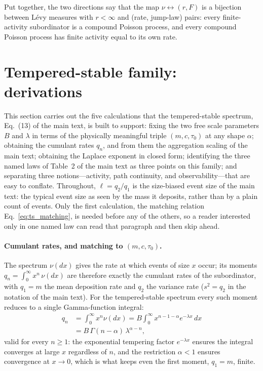 \documentclass[preprint,12pt]{elsarticle}
\begin{document}
Put together, the two directions say that the map
$\nu\leftrightarrow(r,F)$ is a bijection between L\'evy measures with
$r<\infty$ and (rate, jump-law) pairs: every finite-activity subordinator
is a compound Poisson process, and every compound Poisson process has
finite activity equal to its own rate. 

\section{Tempered-stable family: derivations}
\label{app:tempered}

This section carries out the five calculations that the tempered-stable
spectrum, Eq.~(13) of the main text, is built to support: fixing the two free scale parameters $B$ and $\lambda$ in terms of the physically meaningful triple $(m,c,\tau_0)$ at any shape $\alpha$; obtaining the
cumulant rates $q_n$, and from them the aggregation scaling of the main text; obtaining the Laplace exponent in
closed form; identifying the three named laws of Table~2 of the main text as three points on this family; and separating three notions---activity, path continuity, and observability---that are easy to conflate. Throughout, $\ell=q_2/q_1$ is the size-biased
event size of the main text: the typical event size as seen by the mass it deposits, rather than by a plain count of events. Only the first calculation, the matching relation Eq.~\eqref{eq:ts_matching}, is needed before any of the others, so a reader interested only in one named law can read that paragraph and then skip ahead.

\paragraph*{Cumulant rates, and matching to $(m,c,\tau_0)$.}
The spectrum $\nu(dx)$ gives the rate at which events of size $x$ occur; its moments $q_n=\int_0^\infty x^n\,\nu(dx)$ are therefore exactly the cumulant rates of the subordinator, with $q_1=m$ the mean deposition rate and $q_2$ the variance rate ($s^2=q_2$ in the notation of the main text). For the tempered-stable spectrum every such moment reduces to a single Gamma-function integral:
\begin{equation}
\begin{aligned}
  q_n&=\int_0^\infty x^n\nu(dx)
      =B\int_0^\infty x^{n-1-\alpha}e^{-\lambda x}\,dx\\[2pt]
     &=B\,\Gamma(n-\alpha)\,\lambda^{\alpha-n},
\end{aligned}
  \label{eq:ts_qn_general}
\end{equation}
valid for every $n\ge1$: the exponential tempering factor $e^{-\lambda x}$ ensures the integral converges at large $x$ regardless of $n$, and the restriction $\alpha<1$ ensures convergence at $x\to0$, which is what keeps even the first moment, $q_1=m$, finite.
\end{document}
